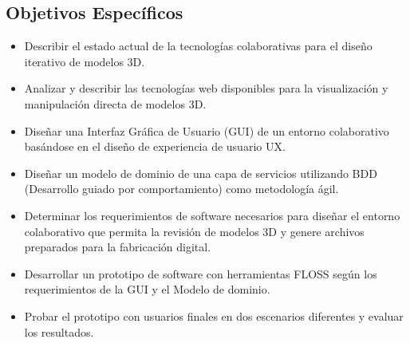 \subsection {Objetivos Específicos}
\begin{itemize}
  \item Describir el estado actual de la tecnologías colaborativas para el diseño iterativo de modelos 3D.
  \item Analizar y describir las tecnologías web disponibles para la visualización y manipulación directa de modelos 3D.
  \item Diseñar una Interfaz Gráfica de Usuario (GUI) de un entorno colaborativo basándose en el diseño de experiencia de usuario UX.
  \item Diseñar un modelo de dominio de una capa de servicios utilizando BDD (Desarrollo guiado por comportamiento) como metodología ágil.
  \item Determinar los requerimientos de software necesarios para diseñar el entorno colaborativo que permita la revisión de modelos 3D y genere archivos preparados para la fabricación digital.
  \item Desarrollar un prototipo de software con herramientas FLOSS según los requerimientos de la GUI y el Modelo de dominio.
  \item Probar el prototipo con usuarios finales en dos escenarios diferentes y evaluar los resultados.
\end{itemize}





